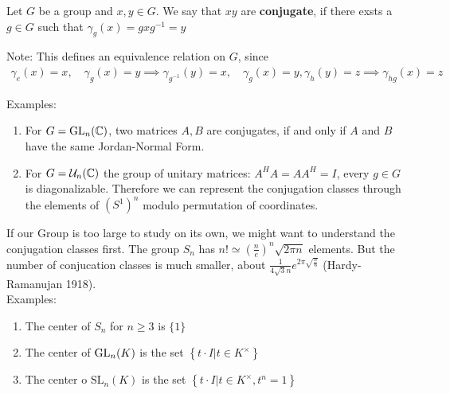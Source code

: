 \begin{definition}[]
	Let $G$ be a group and $x,y \in G$. We say that $xy$ are \textbf{conjugate}, if there exsts a $g \in G$ such that $\gamma_g(x) = gxg^{-1} = y$
\end{definition}
Note: This defines an equivalence relation on $G$, since
\begin{align*}
	\gamma_e(x) = x, \quad \gamma_g(x) = y \implies \gamma_{g^{-1}}(y) = x, \quad \gamma_g(x) = y, \gamma_h(y) = z \implies \gamma_{hg}(x) = z
\end{align*}
 
Examples:
\begin{enumerate}
	\item For $G = \operatorname{GL}_n(\mathbb{C})$, two matrices $A,B$ are conjugates, if and only if $A$ and $B$ have the same Jordan-Normal Form.
	\item For $G = \mathcal{U}_n(\mathbb{C})$ the group of unitary matrices: $A^HA = AA^H = I$, every $g \in G$ is diagonalizable. Therefore we can represent the conjugation classes through the elements of $\left(S^1\right)^n$ modulo permutation of coordinates.
\end{enumerate}
If our Group is too large to study on its own, we might want to understand the conjugation classes first.
The group $S_n$ has $n! \simeq \left(\frac{n}{e}\right)^{n} \sqrt{2\pi n}$ elements. But the number of conjucation classes is much smaller, about $\frac{1}{4 \sqrt{3}n} e^{2\pi \sqrt{\frac{n}{6}}}$ (Hardy-Ramanujan 1918).\\

Examples:
\begin{enumerate}
\item The center of $S_n$ for $n \geq 3$ is $\{1\}$
\item The center of $\operatorname{GL}_n(K)$ is the set $\left\{t \cdot I \big\vert t \in K^{\times}\right\}$
\item The center o $\text{SL}_n(K)$ is the set $\left\{t \cdot I \big\vert t\in K^{\times}, t^n = 1\right\}$
\end{enumerate}

